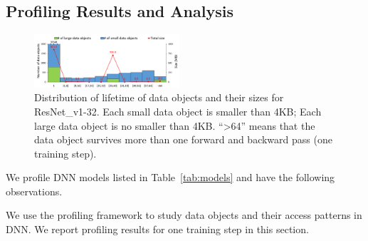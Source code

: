 


\subsection{Profiling Results and Analysis}
\label{sec:profiling_results}


\begin{figure}[!t]
\centering
\includegraphics[width=0.48\textwidth]{figures/figure1.pdf}
\caption{Distribution of lifetime of data objects and their sizes for ResNet\_v1-32. Each small data object is smaller than 4KB; Each large data object is no smaller than 4KB. ``>64'' means that the data object survives more than one forward and backward pass (one training step).}
\label{fig:fig_lifetime}
\end{figure}


\textcolor{dong}{We profile DNN models listed in Table~\ref{tab:models} and have the following observations.}


We use the profiling framework to study data objects and their access patterns in DNN. We report profiling results for one training step in this section.


